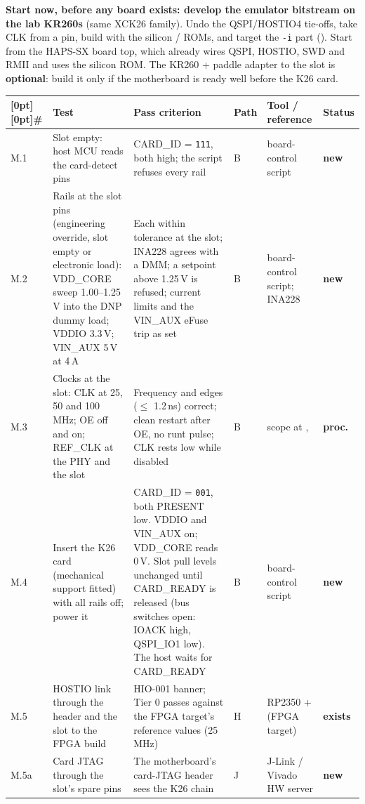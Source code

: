 \documentclass[10pt,a4paper]{article}
\newcommand\EX{\textcolor{ok}{\textbf{exists}}}
\newcommand\NW{\textcolor{warn}{\textbf{new}}}
\newcommand\PR{\textcolor{srcgray}{\textbf{proc.}}}
\newcommand\hd[1]{\textbf{#1}}
\newcommand\phasehead{\toprule
  \rowcolor{headgray}[0pt][0pt]\hd{\#} & \hd{Test} & \hd{Pass criterion} & \hd{Path} & \hd{Tool / reference} & \hd{Status}\\
  \midrule}
\newcommand\phasebegin{\par\noindent\begingroup\footnotesize\setlength{\tabcolsep}{4pt}\renewcommand{\arraystretch}{1.22}}
\newcommand\phaseend{\endgroup\par\medskip}
\renewcommand{\arraystretch}{1.18}
\begin{document}
\textbf{Start now, before any board exists: develop the emulator bitstream on the lab KR260s} (same XCK26 family). Undo the QSPI/HOSTIO4 tie-offs, take CLK from a pin, build with the silicon / ROMs, and target the \texttt{-i} part (). Start from the HAPS-SX board top, which already wires QSPI, HOSTIO, SWD and RMII and uses the silicon ROM. The KR260 + paddle adapter to the slot is \textbf{optional}: build it only if the motherboard is ready well before the K26 card.
\phasebegin\begin{tabularx}{\textwidth}{@{}P{0.75cm}LP{4.7cm}C{0.95cm}P{3.3cm}C{1.05cm}@{}}\phasehead
M.1 & Slot empty: host MCU reads the card-detect pins & CARD\_ID = \texttt{111}, both  high; the script refuses every rail & B & board-control script & \NW \\
M.2 & Rails at the slot pins (engineering override, slot empty or electronic load): VDD\_CORE sweep 1.00--1.25\,V into the DNP dummy load; VDDIO 3.3\,V; VIN\_AUX 5\,V at 4\,A & Each within tolerance at the slot; INA228 agrees with a DMM; a setpoint above 1.25\,V is refused; current limits and the VIN\_AUX eFuse trip as set & B & board-control script; INA228 & \NW \\
M.3 & Clocks at the slot: CLK at 25, 50 and 100\,MHz; OE off and on; REF\_CLK at the PHY and the slot & Frequency and edges ($\le$ 1.2\,ns) correct; clean restart after OE, no runt pulse; CLK rests low while disabled & B & scope at ,  & \PR \\
M.4 & Insert the K26 card (mechanical support fitted) with all rails off; power it & CARD\_ID = \texttt{001}, both PRESENT low. VDDIO and VIN\_AUX on; VDD\_CORE reads 0\,V. Slot pull levels unchanged until CARD\_READY is released (bus switches open: IOACK high, QSPI\_IO1 low). The host waits for CARD\_READY & B & board-control script & \NW \\
M.5 & HOSTIO link through the header and the slot to the FPGA build & HIO-001 banner; Tier 0 passes against the FPGA target's reference values (25\,MHz) & H & RP2350 +  (FPGA target) & \EX \\
M.5a & Card JTAG through the slot's spare pins & The motherboard's card-JTAG header sees the K26 chain & J & J-Link / Vivado HW server & \NW \\
\bottomrule\end{tabularx}\phaseend
\end{document}
